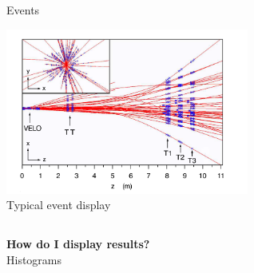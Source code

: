 \begin{frame}{Events}
\begin{center}
     \includegraphics[width=8cm]{Figures Lecture on Datanalysis/2D-Eventdisplay.png} \\
    Typical event display
\end{center}
   \end{frame}
   \subsection{}
   \begin{frame}

        \Large \textbf {How do I display results?} \\ 
        \quad Histograms 

\end{frame}

  
\subsection{}

